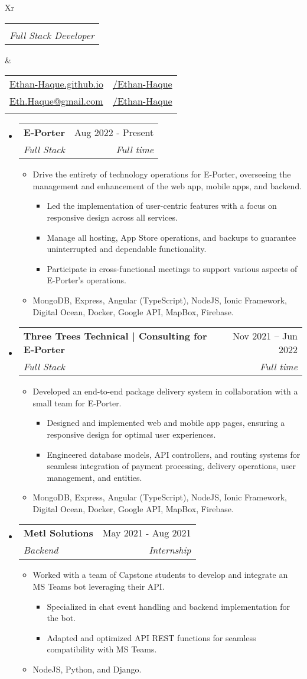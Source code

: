 \documentclass[letterpaper,11pt]{article}[leftmargin=*]
\makeatletter
\def \fullname {Ethan Haque}
\def \subtitle {Full Stack Developer}
\def \linkedinicon {\faLinkedin}
\def \linkedinlink {https://www.linkedin.com/in/ethan-haque}
\def \linkedintext {/Ethan-Haque}
\def \phoneicon {\faPhone}
\def \phonetext {250-880-4402}
\def \emailicon {\faEnvelope}
\def \emaillink {mailto:eth.haque@gmail.com}
\def \emailtext {Eth.Haque@gmail.com}
\def \githubicon {\faGithub}
\def \githublink {https://github.com/Ethan-Haque}
\def \githubtext {/Ethan-Haque}
\def \websiteicon {\faGlobe}
\def \websitelink {https://ethan-haque.github.io}
\def \websitetext {Ethan-Haque.github.io}
\def \headertype {\doublecol} %
\def \entryspacing {-0pt}
\def \linkedin {\linkedinicon \hspace{3pt}\href{\linkedinlink}{\linkedintext}}
\def \phone {\phoneicon \hspace{3pt}{ \phonetext}}
\def \email {\emailicon \hspace{3pt}\href{\emaillink}{\emailtext}}
\def \github {\githubicon \hspace{3pt}\href{\githublink}{\githubtext}}
\def \website {\websiteicon \hspace{3pt}\href{\websitelink}{\websitetext}}
\renewcommand{\section}[2]{\vspace{5pt}
  \tcbox[on line,boxsep=0pt,left=2pt,right=2pt,top=2pt,bottom=2pt,colback=secondary]
  {\color{white}\raggedbottom\normalsize\textbf{{#1}{\hspace{7pt}#2}}}
}
\newcommand{\resumeEntryStart}{\begin{itemize}[leftmargin=2.5mm]}
\newcommand{\resumeEntryEnd}{\end{itemize}\vspace{\entryspacing}}
\newcommand{\resumeItemListStart}{\begin{itemize}[leftmargin=4.5mm]}
\newcommand{\resumeItemListEnd}{\end{itemize}}
\newcommand{\resumeItem}[1]{
  \item\small{
    {#1 \vspace{-2pt}}
  }
}
\newcommand{\resumeEntryTSDL}[4]{
  \vspace{-1pt}\item[]
    \begin{tabularx}{0.97\textwidth}{X@{\hspace{60pt}}r}
      \textbf{\color{primary}#1} & {\firabook\color{accent}\small#2} \\
      \textit{\color{accent}\small#3} & \textit{\color{accent}\small#4} \\
    \end{tabularx}\vspace{-6pt}
}
\newcommand{\doublecol}[6]{
  \begin{tabularx}{\textwidth}{Xr}
    {
      \begin{tabular}[c]{l}
        \fontsize{35}{45}\selectfont{\color{primary}{{\textbf{\fullname}}}} \\
        {\textit{\subtitle}} %
      \end{tabular}
    } & {
      \begin{tabular}[c]{l@{\hspace{1.5em}}l}
        {\small#4} & {\small#1} \\
        {\small#5} & {\small#2} \\
        {\small#6} & {\small#3}
      \end{tabular}
    }
  \end{tabularx}
}
\newcommand{\singlecol}[6]{
  \begin{tabularx}{\textwidth}{Xr}
    {
      \begin{tabular}[b]{l}
        \fontsize{35}{45}\selectfont{\color{primary}{{\textbf{\fullname}}}} \\
        {\textit{\subtitle}} %
      \end{tabular}
    } & {
      \begin{tabular}[c]{l}
        {\small#1} \\
        {\small#2} \\
        {\small#3} \\
        {\small#4} \\
        {\small#5} \\
        {\small#6}
      \end{tabular}
    }
  \end{tabularx}
}
\makeatother
\begin{document}


\headertype{\linkedin}{\github}{}{\website}{\email}{\phone} %


\section{\faPieChart}{Work Experience}

\resumeEntryStart
    \resumeEntryTSDL
      {E-Porter}{Aug 2022 - Present}
      {Full Stack}{Full time}
    \resumeItemListStart
      \resumeItem {Drive the entirety of technology operations for E-Porter, overseeing the management and enhancement of the web app, mobile apps, and backend.}
      \resumeItemListStart
        \resumeItem {Led the implementation of user-centric features with a focus on responsive design across all services.}
        \resumeItem{Manage all hosting, App Store operations, and backups to guarantee uninterrupted and dependable functionality.}
        \resumeItem{Participate in cross-functional meetings to support various aspects of E-Porter's operations.}
      \resumeItemListEnd
      \resumeItem {MongoDB, Express, Angular (TypeScript), NodeJS, Ionic Framework, Digital Ocean, Docker, Google API, MapBox, Firebase.}
    \resumeItemListEnd
  
    \resumeEntryTSDL
      {Three Trees Technical | Consulting for E-Porter}{Nov 2021 -- Jun 2022}
      {Full Stack}{Full time}
    \resumeItemListStart
      \resumeItem {Developed an end-to-end package delivery system in collaboration with a small team for E-Porter.}
      \resumeItemListStart
        \resumeItem {Designed and implemented web and mobile app pages, ensuring a responsive design for optimal user experiences.} 
        \resumeItem {Engineered database models, API controllers, and routing systems for seamless integration of payment processing, delivery operations, user management, and entities.}
      \resumeItemListEnd
      \resumeItem {MongoDB, Express, Angular (TypeScript), NodeJS, Ionic Framework, Digital Ocean, Docker, Google API, MapBox, Firebase.}
    \resumeItemListEnd

    \resumeEntryTSDL
      {Metl Solutions}{May 2021 - Aug 2021}
      {Backend}{Internship}
    \resumeItemListStart
      \resumeItem {Worked with a team of Capstone students to develop and integrate an MS Teams bot leveraging their API.}
      \resumeItemListStart
          \resumeItem {Specialized in chat event handling and backend implementation for the bot.}
          \resumeItem {Adapted and optimized API REST functions for seamless compatibility with MS Teams.}
       \resumeItemListEnd
       \resumeItem {NodeJS, Python, and Django.}
    \resumeItemListEnd
  \resumeEntryEnd
\end{document}

